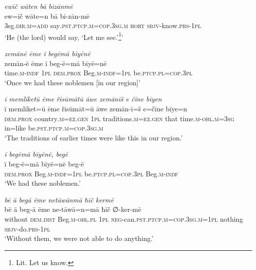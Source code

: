 \ea \label{RE.51}
\textit{ewīč wāten bā bizānmē} \\ 
\gll ew=īč wāte=n bā bi-zān-mē \\ 
 3sg\textsc{.dir}\textsc{.m}\textsc{=add} say\textsc{.pst}\textsc{.ptcp}\textsc{.m}\textsc{=cop}\textsc{.3sg}\textsc{.m} \textsc{hort} \textsc{sbjv-}know\textsc{.prs}\textsc{-\textsc{1pl}} \\ 
\glt `He (the lord) would say, ‘Let me see.’\footnote{Lit. Let us know.}'
\z 
 
\ea \label{RE.56}
\textit{zemānē ēme ī begēmā bīyēnē} \\ 
\gll zemān-ē ēme ī beg-ē=mā bīyē=nē \\ 
 time\textsc{.m}\textsc{-indf} \textsc{1pl} \textsc{dem.prox} Beg\textsc{.m}\textsc{-indf}\textsc{=\textsc{1pl}} be\textsc{.ptcp}\textsc{.pl}\textsc{=cop}\textsc{.3pl} \\ 
\glt `Once we had these noblemen [in our region]'
\z 
 
\ea \label{RE.62}
\textit{ī memliketū ēme řisūmātū āwe zemānīš e čīne bīyen} \\ 
\gll ī memliket=ū ēme řisūmāt=ū āwe zemān-ī=š e=čīne bīye=n \\ 
 \textsc{dem.prox} country\textsc{.m}\textsc{=ez.gen} \textsc{1pl} traditions\textsc{.m}\textsc{=ez.gen} that time\textsc{.m}\textsc{-obl}\textsc{.m}\textsc{=3sg} in=like be\textsc{.pst}\textsc{.ptcp}\textsc{.m}\textsc{=cop}\textsc{.3sg}\textsc{.m} \\ 
\glt `The traditions of earlier times were like this in our region.'
\z 
 
\ea \label{RE.63}
\textit{ī begēmā bīyēnē, begē} \\ 
\gll ī beg-ē=mā bīyē=nē beg-ē \\ 
 \textsc{dem.prox} Beg\textsc{.m}\textsc{-indf}\textsc{=\textsc{1pl}} be\textsc{.ptcp}\textsc{.pl}\textsc{=cop}\textsc{.3pl} Beg\textsc{.m}\textsc{-indf} \\ 
\glt `We had these noblemen.'
\z 
 
\ea \label{RE.64}
\textit{bē ā begā ēme netāwānmā ħīč kermē} \\ 
\gll bē ā beg-ā ēme ne-tāwā=n=mā ħīč ∅-ker-mē \\ 
 without \textsc{dem.dist} Beg\textsc{.m}\textsc{-obl}\textsc{.pl} \textsc{1pl} \textsc{neg-}can\textsc{.pst}\textsc{.ptcp}\textsc{.m}\textsc{=cop}\textsc{.3sg}\textsc{.m}\textsc{=\textsc{1pl}} nothing \textsc{sbjv-}do\textsc{.prs}\textsc{-\textsc{1pl}} \\ 
\glt `Without them, we were not able to do anything.'
\z 
 
